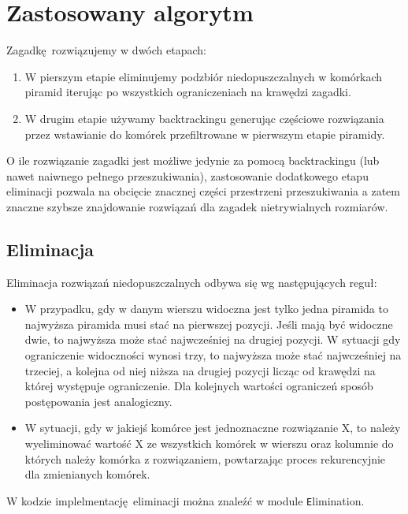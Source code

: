 \section{Zastosowany algorytm}
Zagadkę rozwiązujemy w dwóch etapach:
\begin{enumerate}
    \item W pierszym etapie eliminujemy podzbiór niedopuszczalnych
          w komórkach piramid iterując po wszystkich ograniczeniach
          na krawędzi zagadki.
    \item W drugim etapie używamy backtrackingu generując częściowe
          rozwiązania przez wstawianie do komórek przefiltrowane
          w pierwszym etapie piramidy.
\end{enumerate}

O ile rozwiązanie zagadki jest możliwe jedynie za pomocą backtrackingu
(lub nawet naiwnego pełnego przeszukiwania), zastosowanie dodatkowego
etapu eliminacji pozwala na obcięcie znacznej części przestrzeni przeszukiwania
a zatem znaczne szybsze znajdowanie rozwiązań dla zagadek nietrywialnych
rozmiarów.

\subsection{Eliminacja}
Eliminacja rozwiązań niedopuszczalnych odbywa się wg następujących reguł:

\begin{itemize}  
  \setlength\itemsep{0.1em}

  \item{W przypadku, gdy w danym wierszu widoczna jest tylko jedna piramida to najwyższa piramida musi stać na pierwszej pozycji. Jeśli mają być widoczne dwie, to najwyższa może stać najwcześniej na drugiej pozycji. W sytuacji gdy ograniczenie widoczności wynosi trzy, to najwyższa może stać najwcześniej na trzeciej, a kolejna od niej niższa na drugiej pozycji licząc od krawędzi na której występuje ograniczenie. Dla kolejnych wartości ograniczeń sposób postępowania jest analogiczny.}

  \item{W sytuacji, gdy w jakiejś komórce jest jednoznaczne rozwiązanie X, to należy wyeliminować wartość X ze wszystkich komórek w wierszu oraz kolumnie do których należy komórka z rozwiązaniem, powtarzając proces rekurencyjnie dla zmienianych komórek.}

\end{itemize}

W kodzie implelmentację eliminacji można znaleźć w module {\texttt Elimination}.


